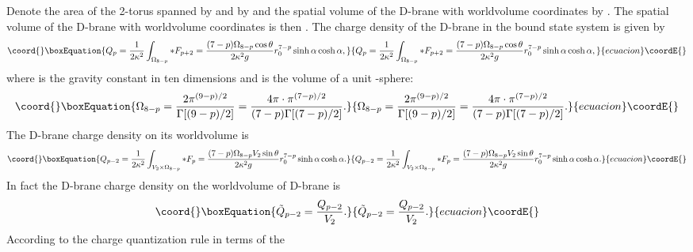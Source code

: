 \documentclass[a4paper,12pt]{article}
\begin{document}
Denote the area of the 2-torus spanned by \coordHE{} and \coordHE{} by \coordHE{} and
the spatial volume of the D\coordHE{}-brane with worldvolume coordinates \coordHE{} by \coordHE{}. The spatial volume of the D\coordHE{}-brane
with worldvolume coordinates \coordHE{} is then
\coordHE{}. The charge density of the D\coordHE{}-brane in the bound
state system is given by
\begin{equation}\coord{}\boxEquation{
\label{2e3}
Q_p =\frac{1}{2\kappa^2}\int_{\Omega_{8-p}}*F_{p+2}
 =\frac{(7-p)\Omega_{8-p} \cos\theta}{2\kappa^2 g}r_0^{7-p}
  \sinh\alpha \cosh\alpha,
}{
Q_p =\frac{1}{2\kappa^2}\int_{\Omega_{8-p}}*F_{p+2}
 =\frac{(7-p)\Omega_{8-p} \cos\theta}{2\kappa^2 g}r_0^{7-p}
  \sinh\alpha \cosh\alpha,
}{ecuacion}\coordE{}\end{equation}
where \coordHE{} is the gravity constant in ten
dimensions and \coordHE{} is the volume of a unit \coordHE{}-sphere:
\begin{equation}\coord{}\boxEquation{
\Omega_{8-p}=\frac{2\pi^{(9-p)/2}}{\Gamma[(9-p)/2]}=\frac{4\pi\cdot
  \pi ^{(7-p)/2}}{(7-p)\Gamma[(7-p)/2]}.
}{
\Omega_{8-p}=\frac{2\pi^{(9-p)/2}}{\Gamma[(9-p)/2]}=\frac{4\pi\cdot
  \pi ^{(7-p)/2}}{(7-p)\Gamma[(7-p)/2]}.
}{ecuacion}\coordE{}\end{equation}
The D\coordHE{}-brane charge density on its worldvolume is
\begin{equation}\coord{}\boxEquation{
Q_{p-2}=\frac{1}{2\kappa^2}\int_{V_2\times\Omega_{8-p}}*F_p
    =\frac{(7-p)\Omega_{8-p}V_2 \sin \theta}{2\kappa^2 g}
      r_0^{7-p}\sinh\alpha\cosh\alpha .
\label{2e5}
}{
Q_{p-2}=\frac{1}{2\kappa^2}\int_{V_2\times\Omega_{8-p}}*F_p
    =\frac{(7-p)\Omega_{8-p}V_2 \sin \theta}{2\kappa^2 g}
      r_0^{7-p}\sinh\alpha\cosh\alpha .
}{ecuacion}\coordE{}\end{equation}
In fact the D\coordHE{}-brane charge density on the worldvolume of D\coordHE{}-brane is
\begin{equation}\coord{}\boxEquation{
\tilde{Q}_{p-2}=\frac{Q_{p-2}}{V_2}.
}{
\tilde{Q}_{p-2}=\frac{Q_{p-2}}{V_2}.
}{ecuacion}\coordE{}\end{equation}
According to the charge quantization rule \coordHE{} in terms of the
\end{document}
